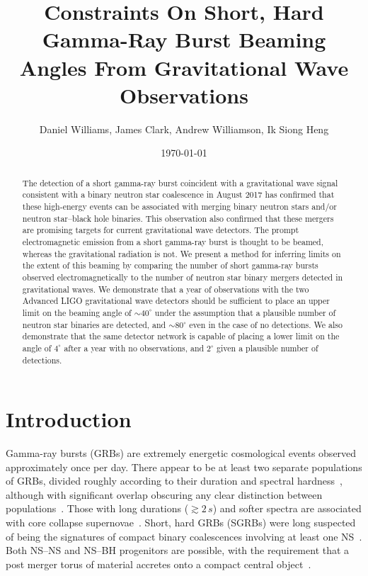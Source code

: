 \documentclass[twocolumn,nofootinbib]{revtex4-1}
\newcommand{\BNS}{\ac{NS}--\ac{NS}\xspace}
\newcommand{\NSBH}{\ac{NS}--\ac{BH}\xspace}
\begin{document}
\title{Constraints On Short, Hard Gamma-Ray Burst Beaming Angles From
Gravitational Wave Observations}
\author{Daniel Williams, James Clark, Andrew Williamson, Ik Siong Heng}
\date{\today}

\begin{abstract}
The detection of a short gamma-ray burst coincident with a
gravitational wave signal consistent with a binary neutron star
coalescence in August 2017 has confirmed that these high-energy events
can be associated with merging binary neutron stars and/or neutron
star--black hole binaries. This observation also confirmed that these
mergers are promising targets for current gravitational wave
detectors. The prompt electromagnetic emission from a short gamma-ray
burst is thought to be beamed, whereas the gravitational radiation is
not. We present a method for inferring limits on the extent of this
beaming by comparing the number of short gamma-ray bursts observed
electromagnetically to the number of neutron star binary mergers
detected in gravitational waves. We demonstrate that a year of
observations with the two Advanced LIGO gravitational wave detectors
should be sufficient to place an upper limit on the beaming angle of
$\sim 40^{\circ}$ under the assumption that a plausible number of
neutron star binaries are detected, and $\sim 80^{\circ}$ even in the
case of no detections. We also demonstrate that the same detector
network is capable of placing a lower limit on the angle of
$4^{\circ}$ after a year with no observations, and $2^{\circ}$ given a
plausible number of detections.
\end{abstract}

\maketitle

\section{Introduction}

Gamma-ray bursts (GRBs) are extremely energetic cosmological events
observed approximately once per day. There appear to be at least two separate
populations of \acp{GRB}, divided roughly according to their duration and
spectral hardness~\cite{Kouveliotou:1993yx}, although with significant overlap
obscuring any clear distinction between
populations~\cite{Zhang:2009uf,Bromberg:2012gp}.
Those with long durations ($\gtrsim 2\,s$) and softer spectra are associated
with core collapse
supernovae~\cite{Galama:1998ea,MacFadyen:1998vz,Woosley:2006fn}. Short, hard
\acp{GRB} (SGRBs) were long suspected of being the signatures of
compact binary coalescences involving at least one
\ac{NS}~\cite{Blinnikov1984,Eichler:1989ve,Paczynski:1991aq,Narayan:1992iy,Lee:2007js}.
Both \BNS and \NSBH progenitors are possible, with the requirement that a post
merger torus of material accretes onto a compact central
object~\cite{Blandford:1977ds,Rosswog:2002rt,Giacomazzo:2012zt}.
\end{document}
